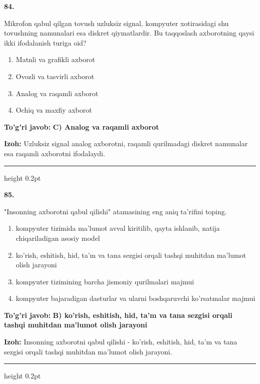 \documentclass[10pt,a4paper,oneside]{article}
\begin{document}
\noindent\textbf{\color{ink}84.}
\par
Mikrofon qabul qilgan tovush uzluksiz signal, kompyuter xotirasidagi shu tovushning namunalari esa diskret qiymatlardir. Bu taqqoslash axborotning qaysi ikki ifodalanish turiga oid?
\begin{enumerate}[label=\Alph*),leftmargin=9mm]
\item Matnli va grafikli axborot
\item Ovozli va tasvirli axborot
\item Analog va raqamli axborot
\item Ochiq va maxfiy axborot
\end{enumerate}
\begin{tcolorbox}[enhanced,breakable,colback=teal!4,colframe=teal!50!black,boxrule=0.5pt,arc=1.1mm,left=3mm,right=3mm,top=1.7mm,bottom=1.7mm,before skip=2mm,after skip=2mm]
\textbf{\color{teal}To'g'ri javob:} \textbf{C) Analog va raqamli axborot}
\par\smallskip
\textbf{Izoh:} Uzluksiz signal analog axborotni, raqamli qurilmadagi diskret namunalar esa raqamli axborotni ifodalaydi.
\end{tcolorbox}
\vspace{2mm}\hrule height 0.2pt \vspace{3mm}

\noindent\textbf{\color{ink}85.}
\par
"Insonning axborotni qabul qilishi" atamasining eng aniq ta'rifini toping.
\begin{enumerate}[label=\Alph*),leftmargin=9mm]
\item kompyuter tizimida ma'lumot avval kiritilib, qayta ishlanib, natija chiqariladigan asosiy model
\item ko'rish, eshitish, hid, ta'm va tana sezgisi orqali tashqi muhitdan ma'lumot olish jarayoni
\item kompyuter tizimining barcha jismoniy qurilmalari majmui
\item kompyuter bajaradigan dasturlar va ularni boshqaruvchi ko'rsatmalar majmui
\end{enumerate}
\begin{tcolorbox}[enhanced,breakable,colback=teal!4,colframe=teal!50!black,boxrule=0.5pt,arc=1.1mm,left=3mm,right=3mm,top=1.7mm,bottom=1.7mm,before skip=2mm,after skip=2mm]
\textbf{\color{teal}To'g'ri javob:} \textbf{B) ko'rish, eshitish, hid, ta'm va tana sezgisi orqali tashqi muhitdan ma'lumot olish jarayoni}
\par\smallskip
\textbf{Izoh:} Insonning axborotni qabul qilishi - ko'rish, eshitish, hid, ta'm va tana sezgisi orqali tashqi muhitdan ma'lumot olish jarayoni.
\end{tcolorbox}
\vspace{2mm}\hrule height 0.2pt \vspace{3mm}
\end{document}
